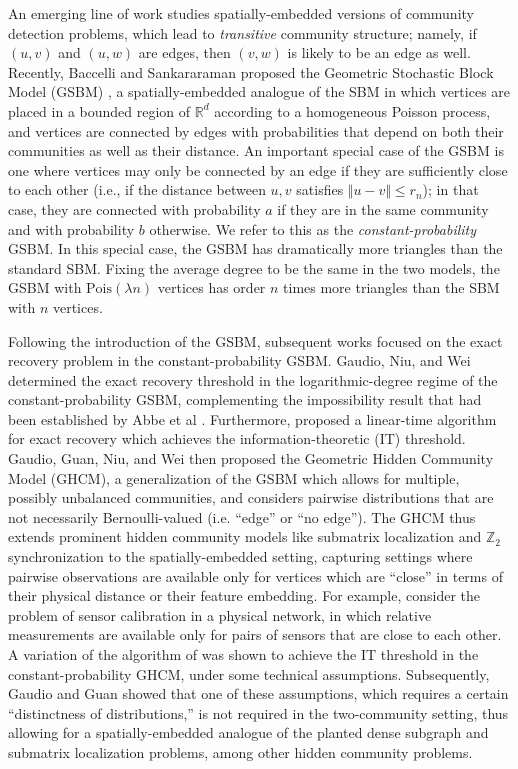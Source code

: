 \documentclass{article}
\newcommand{\1}{\mathbbm{1}}
\theoremstyle{definition}
\theoremstyle{plain}
\begin{document}
An emerging line of work studies spatially-embedded versions of community detection problems, which lead to \emph{transitive} community structure; namely, if $(u,v)$ and $(u,w)$ are edges, then $(v,w)$ is likely to be an edge as well. Recently, Baccelli and Sankararaman proposed the Geometric Stochastic Block Model (GSBM) \cite{Sankararaman2018}, a spatially-embedded analogue of the SBM in which vertices are placed in a bounded region of $\mathbb{R}^d$ according to a homogeneous Poisson process, and vertices are connected by edges with probabilities that depend on both their communities as well as their distance. An important special case of the GSBM is one where vertices may only be connected by an edge if they are sufficiently close to each other (i.e., if the distance between $u,v$ satisfies $\Vert u - v \Vert \leq r_n$); in that case, they are connected with probability $a$ if they are in the same community and with probability $b$ otherwise. We refer to this as the \emph{constant-probability} GSBM. In this special case, the GSBM has dramatically more triangles than the standard SBM. Fixing the average degree to be the same in the two models, the GSBM with $\text{Pois}(\lambda n)$ vertices has order $n$ times more triangles than the SBM with $n$ vertices. 

Following the introduction of the GSBM, subsequent works focused on the exact recovery problem in the constant-probability GSBM. Gaudio, Niu, and Wei \cite{Gaudio+2024} determined the exact recovery threshold in the logarithmic-degree regime of the constant-probability GSBM, complementing the impossibility result that had been established by Abbe et al \cite{Abbe+2020}. Furthermore, \cite{Gaudio+2024} proposed a linear-time algorithm for exact recovery which achieves the information-theoretic (IT) threshold. Gaudio, Guan, Niu, and Wei \cite{Gaudio+2025} then proposed the Geometric Hidden Community Model (GHCM), a generalization of the GSBM which allows for multiple, possibly unbalanced communities, and considers pairwise distributions that are not necessarily Bernoulli-valued (i.e. ``edge'' or ``no edge''). The GHCM thus extends prominent hidden community models like submatrix localization and $\mathbb{Z}_2$ synchronization to the spatially-embedded setting, capturing settings where pairwise observations are available only for vertices which are ``close'' in terms of their physical distance or their feature embedding. For example, consider the problem of sensor calibration in a physical network, in which relative measurements are available only for pairs of sensors that are close to each other. A variation of the algorithm of \cite{Gaudio+2024} was shown to achieve the IT threshold in the constant-probability GHCM, under some technical assumptions. Subsequently, Gaudio and Guan \cite{GaudioGuan2025} showed that one of these assumptions, which requires a certain ``distinctness of distributions,'' is not required in the two-community setting, thus allowing for a spatially-embedded analogue of the planted dense subgraph and submatrix localization problems, among other hidden community problems. 
\end{document}
